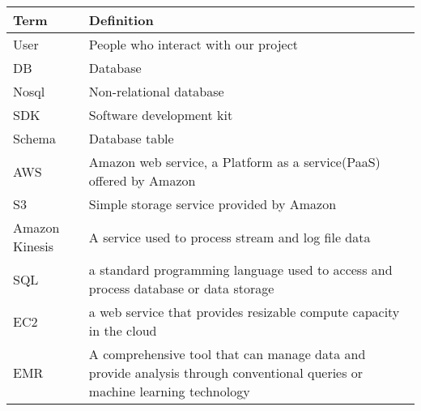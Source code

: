 \begin{tabu} to 
        \hline
        \textbf{Term} & \textbf{Definition}\\
        \hline
        User & People who interact with our project \\
        \hline
        DB & Database\\
        \hline
        Nosql & Non-relational database\\
        \hline
        SDK & Software development kit\\
         \hline
        Schema & Database table \\
        \hline
        AWS & Amazon web service, a Platform as a service(PaaS) offered by Amazon \\
        \hline
        S3 & Simple storage service provided by Amazon\\
        \hline
        Amazon Kinesis & A service used to process stream and log file data \\
        \hline
        SQL & a standard programming language used to access and process database or data storage\\
        \hline
        EC2 & a web service that provides resizable compute capacity in the cloud\cite{g1}\\
        \hline
        EMR & A comprehensive tool that can manage data and provide analysis through conventional queries or machine learning technology\\
		\hline
\end{tabu}